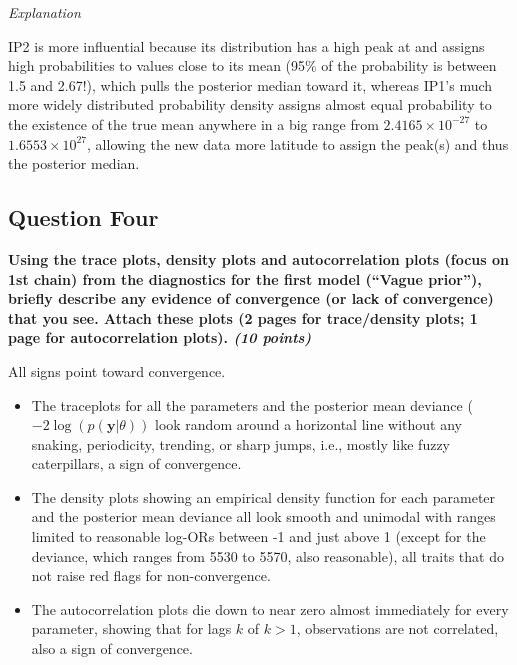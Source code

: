 \documentclass[
  11pt,
]{article}
\begin{document}
\textit{Explanation}

IP2 is more influential because its distribution has a high peak at and
assigns high probabilities to values close to its mean (95\% of the
probability is between 1.5 and 2.67!), which pulls the posterior median
toward it, whereas IP1's much more widely distributed probability
density assigns almost equal probability to the existence of the true
mean anywhere in a big range from \ensuremath{2.4165\times 10^{-27}} to
\ensuremath{1.6553\times 10^{27}}, allowing the new data more latitude
to assign the peak(s) and thus the posterior median.

\pagebreak

\hypertarget{question-four}{%
\subsection{Question Four}\label{question-four}}

\textbf{Using the trace plots, density plots and autocorrelation plots (focus on 1st chain) from the diagnostics for the first model (“Vague prior”), briefly describe any evidence of convergence (or lack of convergence) that you see. Attach these plots (2 pages for trace/density plots; 1 page for autocorrelation plots). \textit{(10 points)}}

All signs point toward convergence.

\begin{itemize}
  \item The traceplots for all the parameters and the posterior mean deviance ($-2\log(p(\textbf{y}|\theta))$ look random around a horizontal line without any snaking, periodicity, trending, or sharp jumps, i.e., mostly like fuzzy caterpillars, a sign of convergence.
  \item The density plots showing an empirical density function for each parameter and the posterior mean deviance all look smooth and unimodal with ranges limited to reasonable log-ORs between -1 and just above 1 (except for the deviance, which ranges from 5530 to 5570, also reasonable), all traits that do not raise red flags for non-convergence. 
  \item The autocorrelation plots die down to near zero almost immediately for every parameter, showing that for lags $k$ of $k > 1$, observations are not correlated, also a sign of convergence.
\end{itemize}
\end{document}
